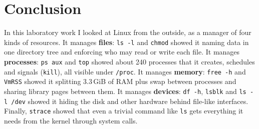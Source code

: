 \documentclass[12pt]{article}
\begin{document}
\break

\section*{Conclusion}
In this laboratory work I looked at Linux from the outside, as a manager of four kinds of resources. It manages \textbf{files}: \texttt{ls -l} and \texttt{chmod} showed it naming data in one directory tree and enforcing who may read or write each file. It manages \textbf{processes}: \texttt{ps aux} and \texttt{top} showed about 240 processes that it creates, schedules and signals (\texttt{kill}), all visible under \texttt{/proc}. It manages \textbf{memory}: \texttt{free -h} and \texttt{VmRSS} showed it splitting 3.3\,GiB of RAM plus swap between processes and sharing library pages between them. It manages \textbf{devices}: \texttt{df -h}, \texttt{lsblk} and \texttt{ls -l /dev} showed it hiding the disk and other hardware behind file-like interfaces. Finally, \texttt{strace} showed that even a trivial command like \texttt{ls} gets everything it needs from the kernel through system calls.
\end{document}
